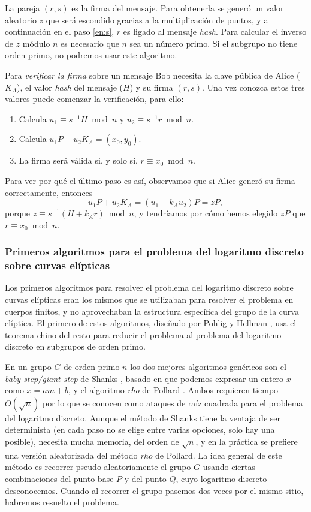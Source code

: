 \documentclass[
  a4paper,
  12pt,
  spanish,
]{scrartcl}
\begin{document}
La pareja $(r, s)$ es la firma del mensaje. Para obtenerla se generó un valor aleatorio $z$ que será escondido gracias a la multiplicación de puntos, y a continuación en el paso \ref{en:s}, $r$ es ligado al mensaje \textit{hash}. Para calcular el inverso de $z$ módulo $n$ es necesario que $n$ sea un número primo. Si el subgrupo no tiene orden primo, no podremos usar este algoritmo.

Para \textit{verificar la firma} sobre un mensaje Bob necesita la clave pública de Alice ($K_A$), el valor \textit{hash} del mensaje ($H$) y su firma $(r,s)$. Una vez conozca estos tres valores puede comenzar la verificación, para ello:

\begin{enumerate}
\item Calcula $u_1 \equiv s^{-1}H \bmod n$ y $u_2 \equiv s^{-1}r \bmod n$.
\item Calcula $u_1P + u_2 K_A = (x_0, y_0)$.
\item La firma será válida si, y solo si, $r \equiv x_0 \bmod n$.
\end{enumerate}

Para ver por qué el último paso es así, observamos que si Alice generó su firma correctamente, entonces \[u_1P+u_2K_A=(u_1+k_Au_2)P=zP,\] porque $z \equiv s^{-1}(H+k_Ar) \bmod n$, y tendríamos por cómo hemos elegido $zP$ que $r \equiv x_0 \bmod n$.

\subsubsection{Primeros algoritmos para el problema del logaritmo discreto sobre curvas elípticas}

Los primeros algoritmos para resolver el problema del logaritmo discreto sobre curvas elípticas eran los mismos que se utilizaban para resolver el problema en cuerpos finitos, y no aprovechaban la estructura específica del grupo de la curva elíptica. El primero de estos algoritmos, diseñado por Pohlig y Hellman \parencite{pohlig_improved_1978}, usa el teorema chino del resto para reducir el problema al problema del logaritmo discreto en subgrupos de orden primo.

En un grupo $G$ de orden primo $n$ los dos mejores algoritmos genéricos son el \textit{baby-step/giant-step} de Shanks \parencite{shanks_class_1969}, basado en que podemos expresar un entero $x$ como $x = am + b$, y el algoritmo \textit{rho} de Pollard \parencite{pollard_monte_1975}. Ambos requieren tiempo $O(\sqrt{n})$ por lo que se conocen como ataques de raíz cuadrada para el problema del logaritmo discreto. Aunque el método de Shanks tiene la ventaja de ser determinista (en cada paso no se elige entre varias opciones, solo hay una posible), necesita mucha memoria, del orden de $\sqrt{n}$, y en la práctica se prefiere una versión aleatorizada del método \textit{rho} de Pollard. La idea general de este método es recorrer pseudo-aleatoriamente el grupo $G$ usando ciertas combinaciones del punto base $P$ y del punto $Q$, cuyo logaritmo discreto desconocemos. Cuando al recorrer el grupo pasemos dos veces por el mismo sitio, habremos resuelto el problema.
\end{document}
